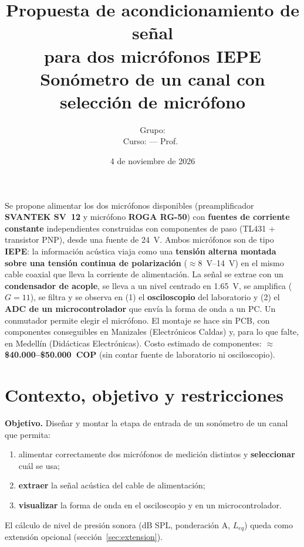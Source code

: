 \documentclass[11pt,a4paper]{article}
\title{\textbf{Propuesta de acondicionamiento de señal\\para dos micrófonos IEPE}\\[4pt]
\large Sonómetro de un canal con selección de micrófono}
\author{Grupo: \nota{nombres} \\ Curso: \nota{nombre del curso} --- Prof.\ \nota{nombre}}
\date{4 de noviembre de 2026}
\begin{document}
\maketitle

\begin{tcolorbox}[title=Resumen de la propuesta]
Se propone alimentar los dos micrófonos disponibles (preamplificador \textbf{SVANTEK SV~12} y micrófono \textbf{ROGA RG-50}) con
\textbf{fuentes de corriente constante} independientes construidas con componentes de paso (TL431 + transistor PNP),
desde una fuente de \SI{24}{\volt}. Ambos micrófonos son de tipo \textbf{IEPE}: la información acústica viaja como una
\textbf{tensión alterna montada sobre una tensión continua de polarización} ($\approx$\SIrange{8}{14}{\volt}) en el mismo
cable coaxial que lleva la corriente de alimentación. La señal se extrae con un \textbf{condensador de acople}, se lleva a un
nivel centrado en \SI{1.65}{\volt}, se amplifica ($G=11$), se filtra y se observa en (1) el \textbf{osciloscopio} del
laboratorio y (2) el \textbf{ADC de un microcontrolador} que envía la forma de onda a un PC. Un conmutador permite
elegir el micrófono. El montaje se hace sin PCB, con componentes conseguibles en Manizales (Electrónicos Caldas) y,
para lo que falte, en Medellín (Didácticas Electrónicas). Costo estimado de componentes: \textbf{$\approx$ \$40.000--\$50.000~COP}
(sin contar fuente de laboratorio ni osciloscopio).
\end{tcolorbox}

\tableofcontents
\newpage

\section{Contexto, objetivo y restricciones}

\textbf{Objetivo.} Diseñar y montar la etapa de entrada de un sonómetro de un canal que permita:
\begin{enumerate}
  \item alimentar correctamente dos micrófonos de medición distintos y \textbf{seleccionar} cuál se usa;
  \item \textbf{extraer} la señal acústica del cable de alimentación;
  \item \textbf{visualizar} la forma de onda en el osciloscopio y en un microcontrolador.
\end{enumerate}
El cálculo de nivel de presión sonora (dB SPL, ponderación A, $L_{eq}$) queda como extensión opcional (sección~\ref{sec:extension}).
\end{document}
